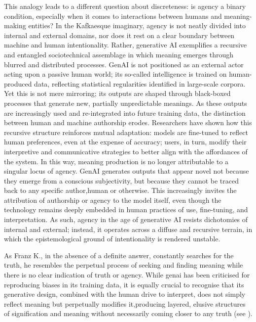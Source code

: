 This analogy leads to a different question about discreteness: is agency a binary condition, especially when it comes to interactions between humans and meaning-making entities? In the Kafkaesque imaginary, agency is not neatly divided into internal and external domains, nor does it rest on a clear boundary between machine and human intentionality. Rather, generative AI exemplifies a recursive and entangled sociotechnical assemblage in which meaning emerges through blurred and distributed processes. GenAI is not positioned as an external actor acting upon a passive human world; its so-called intelligence is trained on human-produced data, reflecting statistical regularities identified in large-scale corpora. Yet this is not mere mirroring; its outputs are shaped through black-boxed processes that generate new, partially unpredictable meanings. As these outputs are increasingly used and re-integrated into future training data, the distinction between human and machine authorship erodes. Researchers have shown how this recursive structure reinforces mutual adaptation: models are fine-tuned to reflect human preferences, even at the expense of accuracy; users, in turn, modify their interpretive and communicative strategies to better align with the affordances of the system. In this way, meaning production is no longer attributable to a singular locus of agency. GenAI generates outputs that appear novel not because they emerge from a conscious subjectivity, but because they cannot be traced back to any specific author,human or otherwise. This increasingly invites the attribution of authorship or agency to the model itself, even though the technology remains deeply embedded in human practices of use, fine-tuning, and interpretation. As such, agency in the age of generative AI resists dichotomies of internal and external; instead, it operates across a diffuse and recursive terrain, in which the epistemological ground of intentionality is rendered unstable.

As Franz K., in the absence of a definite answer, constantly
searches for the truth, he resembles the perpetual process of seeking and finding
meaning while there is no clear indication of truth or agency. While \gls{genai} has been criticised for reproducing biases in its training data, it is equally crucial to recognise that its generative design, combined with the human drive to interpret, does not simply reflect meaning but perpetually modifies it,producing layered, elusive structures of signification and meaning without necessarily coming closer to any truth (see \cite[973--974]{dishon2024}).

